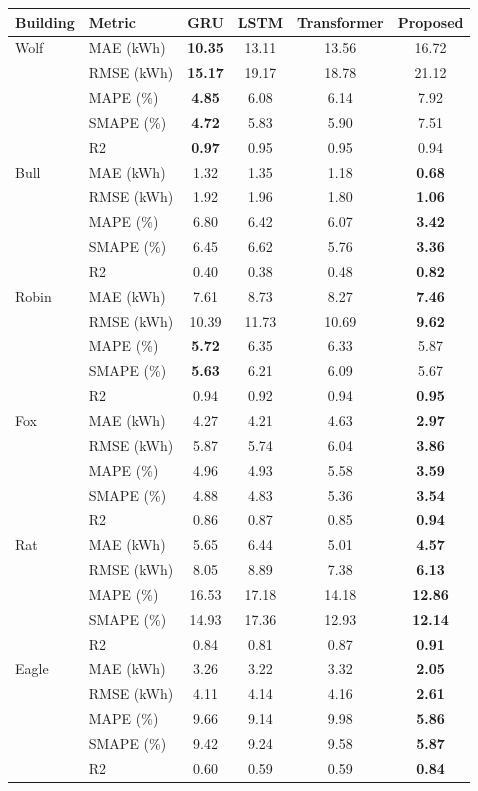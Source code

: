 \begin{tabular}{llcccc}
\toprule
Building & Metric & GRU & LSTM & Transformer & Proposed \\
\midrule
Wolf & MAE (kWh) & \textbf{10.35} & 13.11 & 13.56 & 16.72 \\
 & RMSE (kWh) & \textbf{15.17} & 19.17 & 18.78 & 21.12 \\
 & MAPE (\%) & \textbf{4.85} & 6.08 & 6.14 & 7.92 \\
 & SMAPE (\%) & \textbf{4.72} & 5.83 & 5.90 & 7.51 \\
 & R2 & \textbf{0.97} & 0.95 & 0.95 & 0.94 \\
\midrule
Bull & MAE (kWh) & 1.32 & 1.35 & 1.18 & \textbf{0.68} \\
 & RMSE (kWh) & 1.92 & 1.96 & 1.80 & \textbf{1.06} \\
 & MAPE (\%) & 6.80 & 6.42 & 6.07 & \textbf{3.42} \\
 & SMAPE (\%) & 6.45 & 6.62 & 5.76 & \textbf{3.36} \\
 & R2 & 0.40 & 0.38 & 0.48 & \textbf{0.82} \\
\midrule
Robin & MAE (kWh) & 7.61 & 8.73 & 8.27 & \textbf{7.46} \\
 & RMSE (kWh) & 10.39 & 11.73 & 10.69 & \textbf{9.62} \\
 & MAPE (\%) & \textbf{5.72} & 6.35 & 6.33 & 5.87 \\
 & SMAPE (\%) & \textbf{5.63} & 6.21 & 6.09 & 5.67 \\
 & R2 & 0.94 & 0.92 & 0.94 & \textbf{0.95} \\
\midrule
Fox & MAE (kWh) & 4.27 & 4.21 & 4.63 & \textbf{2.97} \\
 & RMSE (kWh) & 5.87 & 5.74 & 6.04 & \textbf{3.86} \\
 & MAPE (\%) & 4.96 & 4.93 & 5.58 & \textbf{3.59} \\
 & SMAPE (\%) & 4.88 & 4.83 & 5.36 & \textbf{3.54} \\
 & R2 & 0.86 & 0.87 & 0.85 & \textbf{0.94} \\
\midrule
Rat & MAE (kWh) & 5.65 & 6.44 & 5.01 & \textbf{4.57} \\
 & RMSE (kWh) & 8.05 & 8.89 & 7.38 & \textbf{6.13} \\
 & MAPE (\%) & 16.53 & 17.18 & 14.18 & \textbf{12.86} \\
 & SMAPE (\%) & 14.93 & 17.36 & 12.93 & \textbf{12.14} \\
 & R2 & 0.84 & 0.81 & 0.87 & \textbf{0.91} \\
\midrule
Eagle & MAE (kWh) & 3.26 & 3.22 & 3.32 & \textbf{2.05} \\
 & RMSE (kWh) & 4.11 & 4.14 & 4.16 & \textbf{2.61} \\
 & MAPE (\%) & 9.66 & 9.14 & 9.98 & \textbf{5.86} \\
 & SMAPE (\%) & 9.42 & 9.24 & 9.58 & \textbf{5.87} \\
 & R2 & 0.60 & 0.59 & 0.59 & \textbf{0.84} \\
\bottomrule
\end{tabular}